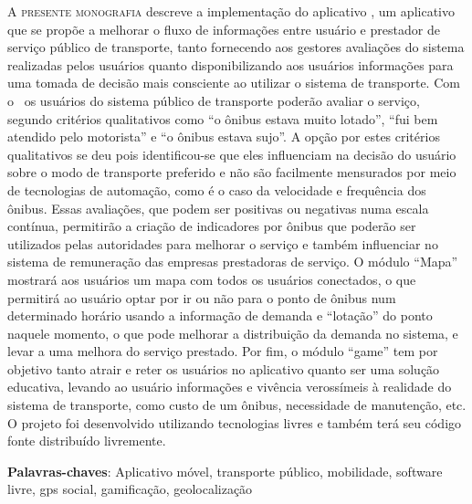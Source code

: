 \lettrine{A}{ presente monografia} descreve a implementação do aplicativo \trilhasp, um aplicativo que se propõe a melhorar o fluxo de informações entre usuário e prestador de serviço público de transporte, tanto fornecendo aos gestores avaliações do sistema realizadas pelos usuários quanto disponibilizando aos usuários informações para uma tomada de decisão mais consciente ao utilizar o sistema de transporte.
Com o \trilhasp~os usuários do sistema público de transporte poderão avaliar o serviço, segundo critérios qualitativos como ``o ônibus estava muito lotado'', ``fui bem atendido pelo motorista'' e ``o ônibus estava sujo''. A opção por estes critérios qualitativos se deu pois identificou-se que eles influenciam na decisão do usuário sobre o modo de transporte preferido e não são facilmente mensurados por meio de tecnologias de automação, como é o caso da velocidade e frequência dos ônibus. Essas avaliações, que podem ser positivas ou negativas numa escala contínua, permitirão a criação de indicadores por ônibus que poderão ser utilizados pelas autoridades para melhorar o serviço e também influenciar no sistema de remuneração das empresas prestadoras de serviço.
O módulo ``Mapa'' mostrará aos usuários um mapa com todos os usuários conectados, o que permitirá ao usuário optar por ir ou não para o ponto de ônibus num determinado horário usando a informação de demanda e ``lotação'' do ponto naquele momento, o que pode melhorar a distribuição da demanda no sistema, e levar a uma melhora do serviço prestado.
Por fim, o módulo ``game'' tem por objetivo tanto atrair e reter os usuários no aplicativo quanto ser uma solução educativa, levando ao usuário informações e vivência verossímeis à realidade do sistema de transporte, como custo de um ônibus, necessidade de manutenção, etc.
O projeto foi desenvolvido utilizando tecnologias livres e também terá seu código fonte distribuído livremente.

\vspace{\onelineskip}

\vfill

\noindent 

\textbf{Palavras-chaves}: Aplicativo móvel, transporte público, mobilidade, software livre, gps social, gamificação, geolocalização